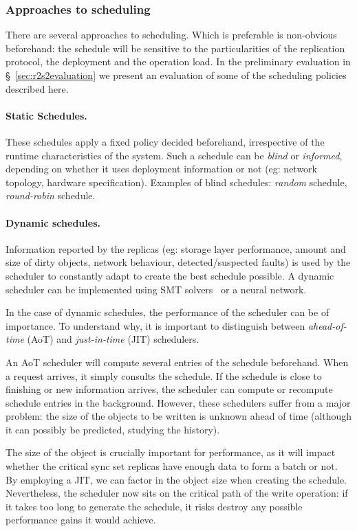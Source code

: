 \subsubsection{Approaches to scheduling}\label{sssec:scheduling_approach}

There are several approaches to scheduling. Which is preferable
is non-obvious beforehand: the schedule will be sensitive to the
particularities of the replication protocol, the deployment and
the operation load. In the preliminary evaluation in
\S~\ref{sec:r2s2evaluation} we present an
evaluation of some of the scheduling policies described
here.

\paragraph{Static Schedules.} These schedules apply a fixed
policy decided beforehand, irrespective of the runtime
characteristics of the system. Such a schedule can be
\emph{blind} or \emph{informed}, depending on whether it uses
deployment information or not (eg: network topology, hardware
specification). Examples of blind schedules: \emph{random}
schedule, \emph{round-robin} schedule.

\paragraph{Dynamic schedules.} Information reported by the
replicas (eg: storage layer performance, amount and size of dirty
objects, network behaviour, detected/suspected faults) is used by
the scheduler to constantly adapt to create the best schedule
possible. A dynamic scheduler can be implemented using
SMT solvers~\cite{smt} or a neural network. 

In the case of dynamic schedules, the performance of the
scheduler can be of importance. To understand why, it is
important to distinguish between \emph{ahead-of-time} (AoT) and
\emph{just-in-time} (JIT) schedulers.

An AoT scheduler will compute several entries of the schedule beforehand. When a
request arrives, it simply consults the schedule. If the schedule
is close to finishing or new information arrives, the scheduler
can compute or recompute schedule entries in the background.
However, these schedulers suffer from a major problem: the size
of the objects to be written is unknown ahead of time (although
it can possibly be predicted, studying the history).

The size of the object is crucially important for performance, as
it will impact whether the critical sync set replicas have
enough data to form a batch or not. By employing a JIT, we can
factor in the object size when creating the schedule.
Nevertheless, the scheduler now sits on the critical path of the
write operation: if it takes too long to generate the schedule,
it risks destroy any possible performance gains it would achieve.

